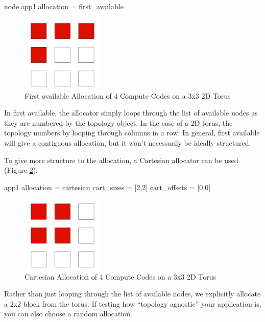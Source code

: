 \begin{ViFile}
node.app1.allocation = first_available
\end{ViFile}
\begin{figure}[h]
\centering
\includegraphics[width=0.35\textwidth]{figures/tikz/allocation/firstavailable.png}
\caption{First available Allocation of 4 Compute Codes on a 3x3 2D Torus}
\label{fig:allocation:first_available}
\end{figure}
In first available, the allocator simply loops through the list of available nodes as they are numbered by the topology object.
In the case of a 2D torus, the topology numbers by looping through columns in a row.
In general, first available will give a contiguous allocation, but it won't necessarily be ideally structured.

To give more structure to the allocation, a Cartesian allocator can be used (Figure \ref{fig:allocation:cartesian}).

\begin{ViFile}
app1 {
 allocation = cartesian
 cart_sizes = [2,2]
 cart_offsets = [0,0]
}
\end{ViFile}
\begin{figure}[h]
\centering
\includegraphics[width=0.35\textwidth]{figures/tikz/allocation/cartesian.png}
\caption{Cartesian Allocation of 4 Compute Codes on a 3x3 2D Torus}
\label{fig:allocation:cartesian}
\end{figure}
Rather than just looping through the list of available nodes, we explicitly allocate a 2x2 block from the torus.
If testing how ``topology agnostic'' your application is, you can also choose a random allocation.

